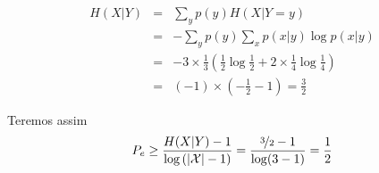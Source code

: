 \begin{questions}
\begin{solution}
  \begin{eqnarray}
  H(X|Y) &=& \sum_{y} p(y) H(X | Y = y) \nonumber \\
        &=& - \sum_{y} p(y) \sum_{x} p(x|y) \log p(x|y) \nonumber \\
        &=& - 3 \times \frac{1}{3} \left( \frac{1}{2} \log \frac{1}{2} + 2 \times \frac{1}{4} \log \frac{1}{4} \right) \nonumber \\
        &=& (-1) \times \left(- \frac{1}{2} - 1 \right) = \frac{3}{2}   
  \end{eqnarray}

  Teremos assim
  \begin{equation}
  P_e \geq \frac{H(X|Y) - 1}{\log \left( \vert \mathcal{X} \vert - 1 \right)} = \frac{\nicefrac{3}{2} -1}{\log(3-1)} = \frac{1}{2}
  \end{equation}

\end{solution}
\end{questions}
